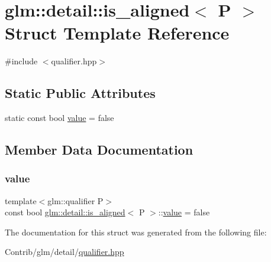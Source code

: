 \hypertarget{structglm_1_1detail_1_1is__aligned}{}\section{glm\+:\+:detail\+:\+:is\+\_\+aligned$<$ P $>$ Struct Template Reference}
\label{structglm_1_1detail_1_1is__aligned}


{\ttfamily \#include $<$qualifier.\+hpp$>$}

\subsection*{Static Public Attributes}
\begin{DoxyCompactItemize}
\item 
static const bool \mbox{\hyperlink{structglm_1_1detail_1_1is__aligned_ac46592cb8bac0221314181e0143aa265}{value}} = false
\end{DoxyCompactItemize}


\subsection{Member Data Documentation}
\mbox{\label{structglm_1_1detail_1_1is__aligned_ac46592cb8bac0221314181e0143aa265}} 
\subsubsection{\texorpdfstring{value}{value}}
{\footnotesize\ttfamily template$<$glm\+::qualifier P$>$ \\
const bool \mbox{\hyperlink{structglm_1_1detail_1_1is__aligned}{glm\+::detail\+::is\+\_\+aligned}}$<$ P $>$\+::\mbox{\hyperlink{_s_d_l__opengl__glext_8h_a8ad81492d410ff2ac11f754f4042150f}{value}} = false\hspace{0.3cm}{\ttfamily [static]}}



The documentation for this struct was generated from the following file\+:\begin{DoxyCompactItemize}
\item 
Contrib/glm/detail/\mbox{\hyperlink{qualifier_8hpp}{qualifier.\+hpp}}\end{DoxyCompactItemize}
